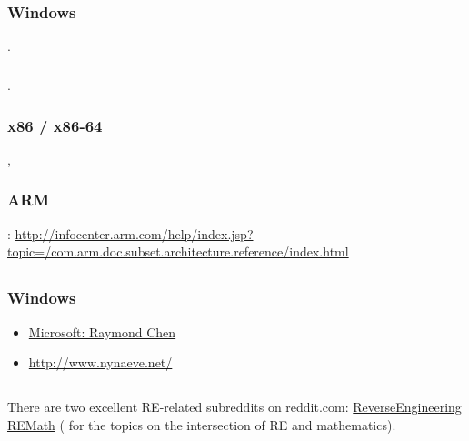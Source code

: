 \chapter{}

\section{}

\subsection{Windows}

\cite{Russinovich}.

\subsection{\CCpp}

\cite{CPP11}.

\subsection{x86 / x86-64}

\cite{Intel}, \cite{AMD}

\subsection{ARM}

: \url{http://infocenter.arm.com/help/index.jsp?topic=/com.arm.doc.subset.architecture.reference/index.html}

\section{}

\subsection{Windows}

\begin{itemize}
\item
\href{http://blogs.msdn.com/oldnewthing/}{Microsoft: Raymond Chen}
\item
\url{http://www.nynaeve.net/}
\end{itemize}

\section{}

{There are two excellent \ac{RE}-related subreddits on reddit.com}: 
\href{http://www.reddit.com/r/ReverseEngineering/}{ReverseEngineering} \AndENRU 
\href{http://www.reddit.com/r/remath}{REMath}
(
{for the topics on the intersection of \ac{RE} and mathematics}).

